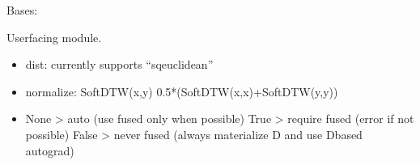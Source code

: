 \documentclass[letterpaper,10pt,english]{sphinxmanual}
\begin{document}
\begin{fulllineitems}
\label{\detokenize{dtw_loss_functions.soft_dtw_implementations.soft_dtw_cuda_ron:dtw_loss_functions.soft_dtw_implementations.soft_dtw_cuda_ron.SoftDTW}}
\pysigstartsignatures
\pysiglinewithargsret
{}
{\sphinxparamcomma {}\sphinxparamcomma {}\sphinxparamcomma {}\sphinxparamcomma {}\sphinxparamcomma {}}
{}
\pysigstopsignatures
\sphinxAtStartPar
Bases: 

\sphinxAtStartPar
User\sphinxhyphen{}facing module.
\begin{itemize}
\item {} 
\sphinxAtStartPar
dist: currently supports “sqeuclidean”

\item {} 
\sphinxAtStartPar
normalize: SoftDTW(x,y) \sphinxhyphen{} 0.5*(SoftDTW(x,x)+SoftDTW(y,y))

\item {} \begin{description}
\sphinxAtStartPar
None  \sphinxhyphen{}\textgreater{} auto (use fused only when possible)
True  \sphinxhyphen{}\textgreater{} require fused (error if not possible)
False \sphinxhyphen{}\textgreater{} never fused (always materialize D and use D\sphinxhyphen{}based autograd)

\end{description}


\end{itemize}
\end{fulllineitems}
\end{document}
